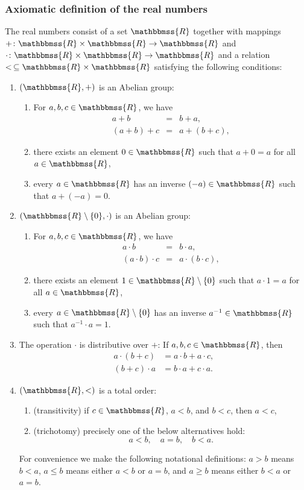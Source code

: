 \documentclass[12pt]{article}
\newcommand{\R}{\mathbbmss{R}}
\begin{document}
\subsubsection*{Axiomatic definition of the real numbers}
The real numbers consist of a set $\R$ together with mappings
$+\colon \R\times \R\to \R$ and $\cdot\colon \R\times \R \to\R$ and a
relation $< \,\subseteq \R\times\R$ satisfying
 the following conditions:
\begin{enumerate}
\item $(\R,+)$ is an Abelian group:
\begin{enumerate}
\item For $a,b,c\in \R$, we have
\begin{eqnarray*}
  a+b&=&b+a, \\
(a+b)+c&=&a+(b+c),
\end{eqnarray*}
\item there exists an element $0\in \R$ such that $a+0=a$ for all $a\in \R$,
\item every $a\in \R$ has an inverse $(-a)\in\R$ such that $a+(-a)=0$. 
\end{enumerate}
\item $(\R\setminus\{0\}, \cdot)$ is an Abelian group: 
\begin{enumerate}
\item For $a,b,c\in \R$, we have
\begin{eqnarray*}
  a\cdot b&=&b\cdot a, \\
(a\cdot b)\cdot c&=&a\cdot (b\cdot c),
\end{eqnarray*}
\item there exists an element $1\in \R\setminus\{0\}$ such that $a\cdot 1=a$ for all $a\in \R$,
\item every $a\in \R\setminus\{0\}$ has an inverse $a^{-1}\in\R$ 
      such that $a^{-1}\cdot a=1$. 
\end{enumerate}
\item The operation $\cdot$ is distributive over  $+$: If $a,b,c\in \R$, then 
\begin{eqnarray*}
  a\cdot (b+c)&=a\cdot b + a\cdot c, \\
   (b+c)\cdot a&=b\cdot a + c\cdot a.
\end{eqnarray*}
\item $(\R,<)$ is a total order:
\begin{enumerate}
\item (transitivity) if $c\in\R$, $a<b$, and $b<c$, then $a<c$,
\item (trichotomy) precisely one of the below alternatives
hold:
\[
  a<b, \quad a=b, \quad b<a.
\]
\end{enumerate}
For convenience we make the following notational definitions:
$a>b$ means $b<a$, $a\le b$ means either $a<b$ or $a=b$, and $a\ge b$
means either $b<a$ or $a=b$.


\end{enumerate}
\end{document}
